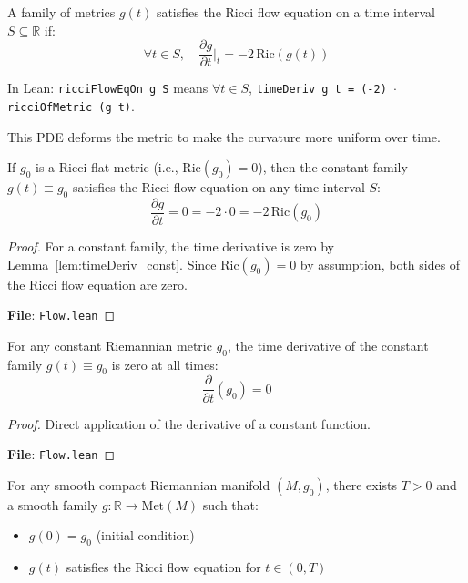 \begin{definition}
\label{def:ricci_flow_eq_on}
\leanok
{}
A family of metrics $g(t)$ satisfies the Ricci flow equation on a time interval $S \subseteq \mathbb{R}$ if:
\[ \forall t \in S, \quad \frac{\partial g}{\partial t}\Big|_t = -2 \, \mathrm{Ric}(g(t)) \]

In Lean: \texttt{ricciFlowEqOn g S} means $\forall t \in S$, \texttt{timeDeriv g t = (-2) $\cdot$ ricciOfMetric (g t)}.

This PDE deforms the metric to make the curvature more uniform over time.
\end{definition}

\begin{lemma}
\label{lem:ricciFlowEqOn_const_of_ricciFlat}
\leanok
{}
If $g_0$ is a Ricci-flat metric (i.e., $\mathrm{Ric}(g_0) = 0$), then the constant family $g(t) \equiv g_0$ satisfies the Ricci flow equation on any time interval $S$:
\[ \frac{\partial g}{\partial t} = 0 = -2 \cdot 0 = -2 \, \mathrm{Ric}(g_0) \]
\end{lemma}

\begin{proof}
\leanok
{}
For a constant family, the time derivative is zero by Lemma~\ref{lem:timeDeriv_const}. Since $\mathrm{Ric}(g_0) = 0$ by assumption, both sides of the Ricci flow equation are zero.

\textbf{File}: \texttt{Flow.lean}
\end{proof}

\begin{lemma}
\label{lem:timeDeriv_const}
\leanok
{}
For any constant Riemannian metric $g_0$, the time derivative of the constant family $g(t) \equiv g_0$ is zero at all times:
\[ \frac{\partial}{\partial t}(g_0) = 0 \]
\end{lemma}

\begin{proof}
\leanok
{}
Direct application of the derivative of a constant function.

\textbf{File}: \texttt{Flow.lean}
\end{proof}

\begin{theorem}
\label{axiom:hamilton_ste}
For any smooth compact Riemannian manifold $(M, g_0)$, there exists $T > 0$ and a smooth family $g : \mathbb{R} \to \mathrm{Met}(M)$ such that:
\begin{itemize}
\item $g(0) = g_0$ (initial condition)
\item $g(t)$ satisfies the Ricci flow equation for $t \in (0, T)$
\end{itemize}
\end{theorem}

